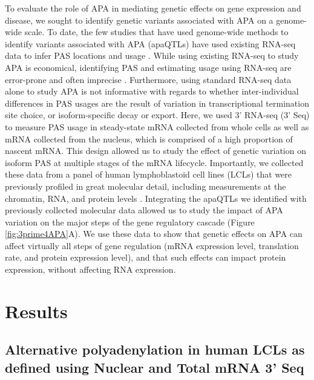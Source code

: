 To evaluate the role of APA in mediating genetic effects on gene expression and disease, we sought to identify genetic variants associated with APA on a genome-wide scale. To date, the few studies that have used genome-wide methods to identify variants associated with APA (apaQTLs) have used existing RNA-seq data to infer PAS locations and usage \citep{li_genetic_2019, yoon_genetics_2012, yang_snp2apa_2019, bonder_systematic_2019, mariella_length_2019-1}. While using existing RNA-seq to study APA is economical, identifying PAS and estimating usage using RNA-seq are error-prone and often imprecise \citep{ha_qapa_2018}. Furthermore, using standard RNA-seq data alone to study APA is not informative with regards to whether inter-individual differences in PAS usages are the result of variation in transcriptional termination site choice, or isoform-specific decay or export. Here, we used 3' RNA-seq (3' Seq) to measure PAS usage in steady-state mRNA collected from whole cells as well as mRNA collected from the nucleus, which is comprised of a high proportion of nascent mRNA. This design allowed us to study the effect of genetic variation on isoform PAS at multiple stages of the mRNA lifecycle. Importantly, we collected these data from a panel of human lymphoblastoid cell lines (LCLs) that were previously profiled in great molecular detail, including measurements at the chromatin, RNA, and protein levels \citep{degner_dnase_2012, mcvicker_identification_2013, li_rna_2016, pickrell_understanding_2010}. Integrating the apaQTLs we identified with previously collected molecular data allowed us to study the impact of APA variation on the major steps of the gene regulatory cascade (Figure \ref{fig:3prime4APA}A). We use these data to show that genetic effects on APA can affect virtually all steps of gene regulation (mRNA expression level, translation rate, and protein expression level), and that such effects can impact protein expression, without affecting RNA expression.

\section{Results}\label{ch02-results}

\subsection{Alternative polyadenylation in human LCLs as defined using Nuclear and Total mRNA 3' Seq}\label{APA-LCL-total-nuc}

